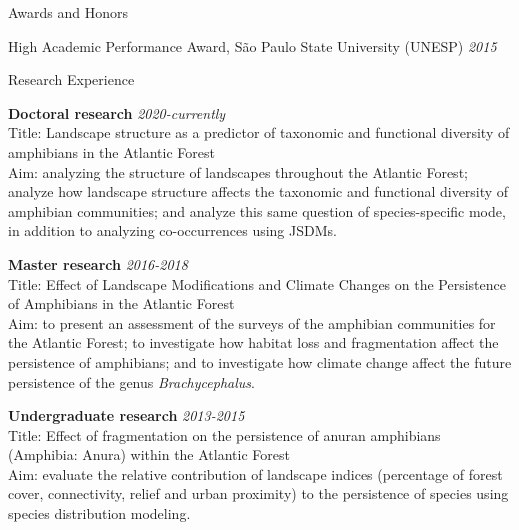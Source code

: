 \documentclass{resume}
\begin{document}

\begin{rSection}{Awards and Honors} 

{High Academic Performance Award, São Paulo State University (UNESP)} \hfill{\em 2015}

\end{rSection}


\begin{rSection}{Research Experience}

{\bf Doctoral research} \hfill{\em 2020-currently} \\ 
Title: Landscape structure as a predictor of taxonomic and functional diversity of amphibians in the Atlantic Forest \\ 
Aim: analyzing the structure of landscapes throughout the Atlantic Forest; analyze how landscape structure affects the taxonomic and functional diversity of amphibian communities; and analyze this same question of species-specific mode, in addition to analyzing co-occurrences using JSDMs.

{\bf Master research} \hfill{\em 2016-2018} \\ 
Title: Effect of Landscape Modifications and Climate Changes on the Persistence of Amphibians in the Atlantic Forest \\ 
Aim: to present an assessment of the surveys of the amphibian communities for the Atlantic Forest; to investigate how habitat loss and fragmentation affect the persistence of amphibians; and to investigate how climate change affect the future persistence of the genus {\it Brachycephalus}.

{\bf Undergraduate research} \hfill{\em 2013-2015} \\ 
Title: Effect of fragmentation on the persistence of anuran amphibians (Amphibia: Anura) within the Atlantic Forest \\ 
Aim: evaluate the relative contribution of landscape indices (percentage of forest cover, connectivity, relief and urban proximity) to the persistence of species using species distribution modeling.

\end{rSection}
\end{document}
